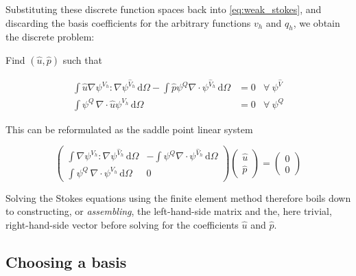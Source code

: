 \documentclass[thesis]{subfiles}
\begin{document}
Substituting these discrete function spaces back into \cref{eq:weak_stokes}, and discarding the basis coefficients for the arbitrary functions $v_h$ and $q_h$, we obtain the discrete problem:

\vspace{1em}

Find $(\hat u, \hat p)$ such that

\begin{subequations}
  \begin{align}
    \int \hat u \nabla \psi^{V_h} : \nabla \psi^{\hat V_h} \, \textrm{d}\Omega
    - \int \hat p \psi^Q \nabla \cdot \psi^{\hat V_h} \, \textrm{d}\Omega
    &= 0
    &\forall \ \psi^{\hat V} \\
    \int \psi^Q \, \nabla \cdot \hat u \psi^{V_h} \, \textrm{d}\Omega
    &= 0
    &\forall \ \psi^{Q}
  \end{align}
  \label{eq:weak_stokes_discrete}
\end{subequations}

This can be reformulated as the saddle point linear system

\begin{equation}
  \left (
  \begin{array}{c|c}
    \int \nabla \psi^{V_h} : \nabla \psi^{\hat V_h} \, \textrm{d}\Omega
    &
    - \int \psi^Q \nabla \cdot \psi^{\hat V_h} \, \textrm{d}\Omega \\
    \hline
    \int \psi^Q \, \nabla \cdot \psi^{V_h} \, \textrm{d}\Omega
    &
    0
  \end{array}
  \right )
  \left (
  \begin{array}{c}
    \hat u \\
    \hline
    \hat p
  \end{array}
  \right )
  =
  \left (
  \begin{array}{c}
    0 \\ \hline 0
  \end{array}
  \right )
  \label{eq:stokes_linear_system}
\end{equation}

Solving the Stokes equations using the finite element method therefore boils down to constructing, or \textit{assembling}, the left-hand-side matrix and the, here trivial, right-hand-side vector before solving for the coefficients $\hat u$ and $\hat p$.

\subsection{Choosing a basis}
\end{document}
